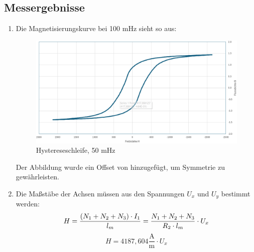 \documentclass[a4paper,twoside,12pt,DIV=13,BCOR=5mm,numbers=noenddot,cleardoublepage=empty]{scrbook}
\begin{document}
    \newpage



    \subsection{Messergebnisse}

        \begin{enumerate}
            \item Die Magnetisierungskurve bei 100 mHz sieht so aus:

            \begin{figure}[h] 
            \centering
            \includegraphics[width=1\textwidth]{pictures/50mHz.png} 
            \caption{Hystereseschleife, 50 mHz}
            \label{fig:meinbild}
             \end{figure}
		Der Abbildung wurde ein Offset von  hinzugefügt, um Symmetrie zu gewährleisten.
            \item
                Die Maßstäbe der Achsen müssen aus den Spannungen $U_x$ und $U_y$ bestimmt werden:
                \begin{equation}
                    H = \frac{(N_1 + N_2 + N_3) \cdot I_1}{l_m} \\
                    = \frac{N_1 + N_2 + N_3}{R_2 \cdot l_m} \cdot U_x \\
                \end{equation}
                \begin{equation}
                    H = 4187,604 \frac{\text{A}}{\text{m}} \cdot U_x
                \end{equation}


\end{enumerate}
\end{document}
